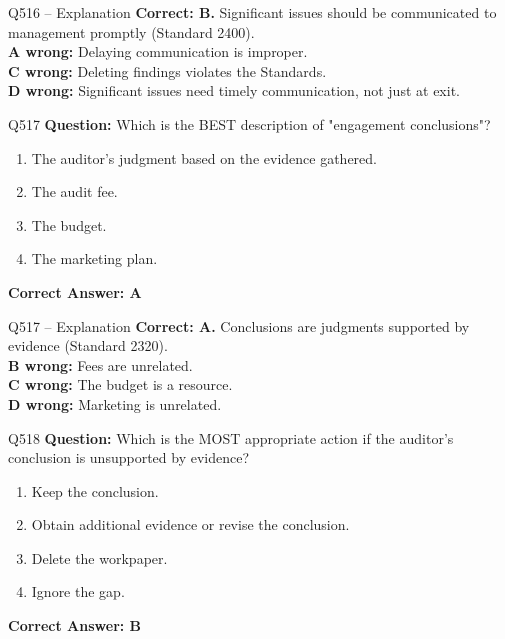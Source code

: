 \documentclass[aspectratio=169,10pt]{beamer}
\begin{document}
	\begin{frame}[t]{Q516 -- Explanation}
		\small
		\textbf{Correct: B.} Significant issues should be communicated to management promptly (Standard 2400). \\[4pt]
		\textbf{A wrong:} Delaying communication is improper. \\[2pt]
		\textbf{C wrong:} Deleting findings violates the Standards. \\[2pt]
		\textbf{D wrong:} Significant issues need timely communication, not just at exit.
	\end{frame}
	
	\begin{frame}[t]{Q517}
		\small
		\textbf{Question:} Which is the BEST description of "engagement conclusions"?
		\begin{enumerate}[label=\Alph*.,itemsep=1pt,topsep=2pt]
			\item The auditor's judgment based on the evidence gathered.
			\item The audit fee.
			\item The budget.
			\item The marketing plan.
		\end{enumerate}
		\vspace{4pt}
		\textbf{Correct Answer: A}
	\end{frame}
	
	\begin{frame}[t]{Q517 -- Explanation}
		\small
		\textbf{Correct: A.} Conclusions are judgments supported by evidence (Standard 2320). \\[4pt]
		\textbf{B wrong:} Fees are unrelated. \\[2pt]
		\textbf{C wrong:} The budget is a resource. \\[2pt]
		\textbf{D wrong:} Marketing is unrelated.
	\end{frame}
	
	\begin{frame}[t]{Q518}
		\small
		\textbf{Question:} Which is the MOST appropriate action if the auditor's conclusion is unsupported by evidence?
		\begin{enumerate}[label=\Alph*.,itemsep=1pt,topsep=2pt]
			\item Keep the conclusion.
			\item Obtain additional evidence or revise the conclusion.
			\item Delete the workpaper.
			\item Ignore the gap.
		\end{enumerate}
		\vspace{4pt}
		\textbf{Correct Answer: B}
	\end{frame}
	
\end{document}
